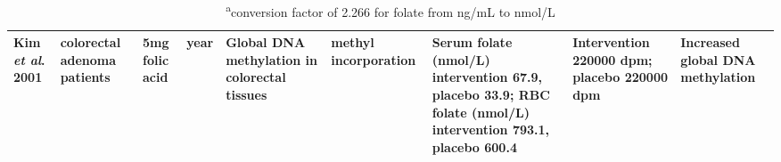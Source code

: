 \begin{sidewaystable}[hp!]
\begin{tabular}{L{1.3cm}C{1.5cm}C{1.5cm}C{1.2cm}C{1.4cm}C{1.5cm}C{2.2cm}C{2cm}C{1.8cm}}
\parbox[t][2.75cm]{1.3cm}{\raggedright Kim \textit{et al}. 2001 \cite{c440}} &
\parbox[t][2.75cm]{1.5cm}{ colorectal adenoma patients} &
\parbox[t][2.75cm]{1.5cm}{\centering 5mg folic acid} &
\parbox[t][2.75cm]{1.2cm}{ year} &
\parbox[t][2.75cm]{1.4cm}{\centering Global DNA methylation in colorectal tissues} &
\parbox[t][2.75cm]{1.5cm}{\centering [\textsuperscript{3}H] methyl incorporation} &
\parbox[t][2.75cm]{2.2cm}{\centering Serum folate (nmol/L) intervention 67.9, placebo 33.9; RBC folate (nmol/L) intervention 793.1, placebo 600.4} &
\parbox[t][2.75cm]{2.0cm}{\centering Intervention 220000 dpm; placebo 220000 dpm} &
\parbox[t][2.75cm]{1.8cm}{\centering Increased global DNA methylation}\\
\hline
\end{tabular}
\caption*{\footnotesize{\textsuperscript{a}conversion factor of 2.266 for folate from ng/mL to nmol/L}}
\end{sidewaystable}

